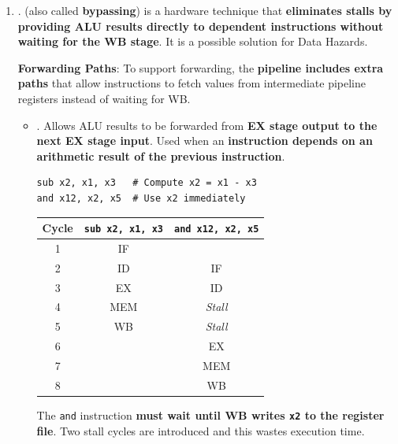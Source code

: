 \begin{enumerate}[label=\textcolor{Green3}{\faIcon{check}}]
   \item {}.  (also called \textbf{bypassing}) is a hardware technique that \textbf{eliminates stalls by providing ALU results directly to dependent instructions without waiting for the WB stage}. It is a possible solution for Data Hazards.

   \textcolor{Green3}{\faIcon{\speedIcon} \textbf{Forwarding Paths}}: To support forwarding, the \textbf{pipeline includes extra paths} that allow instructions to fetch values from intermediate pipeline registers instead of waiting for WB.
   \begin{itemize}
      \item {}. Allows ALU results to be forwarded from \textbf{EX stage output to the next EX stage input}. Used when an \textbf{instruction depends on an arithmetic result of the previous instruction}.
      \begin{examplebox}[: EX/EX Forwarding]
         \begin{lstlisting}
sub x2, x1, x3   # Compute x2 = x1 - x3
and x12, x2, x5  # Use x2 immediately\end{lstlisting}
         \begin{center}
            \begin{tabular}{@{} c | c | c @{}}
               \toprule
               \textbf{Cycle} & \texttt{sub x2, x1, x3} & \texttt{and x12, x2, x5} \\
               \midrule
               1 & IF  & \\
               2 & ID  & IF      \\ [.3em]
               3 & EX  & ID      \\ [.3em]
               4 & MEM & \emph{Stall} \\ [.3em]
               5 & WB  & \emph{Stall} \\ [.3em]
               6 &     & EX      \\ [.3em]
               7 &     & MEM     \\ [.3em]
               8 &     & WB      \\
               \bottomrule
            \end{tabular}
         \end{center}
         The \texttt{and} instruction \textbf{must wait until WB writes \texttt{x2} to the register file}. Two stall cycles are introduced and this wastes execution time.


\end{examplebox}
\end{itemize}
\end{enumerate}
